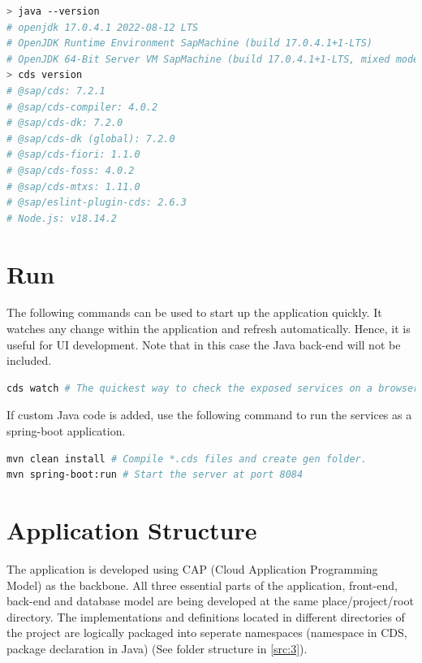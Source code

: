 \begin{lstlisting}[language={bash}]
> java --version
# openjdk 17.0.4.1 2022-08-12 LTS
# OpenJDK Runtime Environment SapMachine (build 17.0.4.1+1-LTS)
# OpenJDK 64-Bit Server VM SapMachine (build 17.0.4.1+1-LTS, mixed mode, sharing)
> cds version
# @sap/cds: 7.2.1
# @sap/cds-compiler: 4.0.2
# @sap/cds-dk: 7.2.0
# @sap/cds-dk (global): 7.2.0
# @sap/cds-fiori: 1.1.0
# @sap/cds-foss: 4.0.2
# @sap/cds-mtxs: 1.11.0
# @sap/eslint-plugin-cds: 2.6.3
# Node.js: v18.14.2
\end{lstlisting}


\section{Run}
\label{sec:D-run}

The following commands can be used to start up the application quickly. It watches any change within the application and refresh automatically. Hence, it is useful for UI development. Note that in this case the Java back-end will not be included.

\begin{lstlisting}[language={bash}]
cds watch # The quickest way to check the exposed services on a browser.
\end{lstlisting}

If custom Java code is added, use the following command to run the services as a spring-boot application.
\begin{lstlisting}[language={bash}]
mvn clean install # Compile *.cds files and create gen folder.
mvn spring-boot:run # Start the server at port 8084
\end{lstlisting}

\section{Application Structure}
\label{sec:D-AppStructure}

The application is developed using CAP (Cloud Application Programming Model) as the backbone. 
All three essential parts of the application, front-end, back-end and database model are being developed at the same place/project/root directory. 
The implementations and definitions located in different directories of the project are logically packaged into seperate namespaces (namespace in CDS, package declaration in Java) (See folder structure in \autoref{src:3}).


